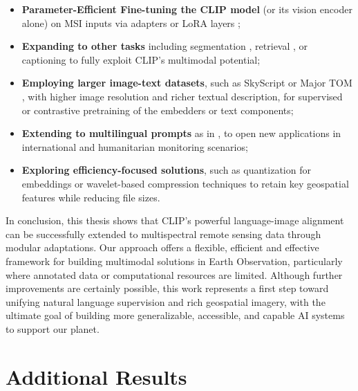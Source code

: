 \documentclass[a4paper, oneside, english]{sapthesis} %
\begin{document}
\begin{itemize}
    \item \textbf{Parameter-Efficient Fine-tuning the CLIP model} (or its vision encoder alone) on MSI inputs via adapters or LoRA layers \cite{hu2021loralowrankadaptationlarge} \cite{xin2024parameter};
    \item \textbf{Expanding to other tasks} including segmentation \cite{luddecke2022image}, retrieval \cite{radford2021learning}, or captioning \cite{li2022blip} to fully exploit CLIP's multimodal potential;
    \item \textbf{Employing larger image-text datasets}, such as SkyScript \cite{wang2024skyscript} or Major TOM \cite{francis2024major}, with higher image resolution and richer textual description, for supervised or contrastive pretraining of the embedders or text components;
    \item \textbf{Extending to multilingual prompts} as in \cite{silva2024multilingual}, to open new applications in international and humanitarian monitoring scenarios;
    \item \textbf{Exploring efficiency-focused solutions}, such as quantization for embeddings \cite{jegou2010product} or wavelet-based compression techniques \cite{biswas2025wavelet} to retain key geospatial features while reducing file sizes.
\end{itemize}

In conclusion, this thesis shows that CLIP's powerful language-image alignment can be successfully extended to multispectral remote sensing data through modular adaptations. Our approach offers a flexible, efficient and effective framework for building multimodal solutions in Earth Observation, particularly where annotated data or computational resources are limited. Although further improvements are certainly possible, this work represents a first step toward unifying natural language supervision and rich geospatial imagery, with the ultimate goal of building more generalizable, accessible, and capable AI systems to support our planet.



\cleardoublepage

\appendix
\chapter{Additional Results}\label{sec:appendix}
\end{document}
